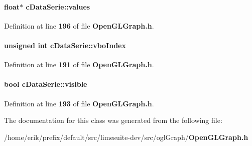 \paragraph[{values}]{\setlength{\rightskip}{0pt plus 5cm}float$\ast$ c\+Data\+Serie\+::values}\label{classcDataSerie_ac5a3ab7bf7737b1c0b9de669a98eeee3}


Definition at line {\bf 196} of file {\bf Open\+G\+L\+Graph.\+h}.

\paragraph[{vbo\+Index}]{\setlength{\rightskip}{0pt plus 5cm}unsigned {\bf int} c\+Data\+Serie\+::vbo\+Index}\label{classcDataSerie_aed65cceb54652b428820fe90b2843d95}


Definition at line {\bf 191} of file {\bf Open\+G\+L\+Graph.\+h}.

\paragraph[{visible}]{\setlength{\rightskip}{0pt plus 5cm}bool c\+Data\+Serie\+::visible}\label{classcDataSerie_a4b0ca62a320b263fb925d27dc40e55e8}


Definition at line {\bf 193} of file {\bf Open\+G\+L\+Graph.\+h}.



The documentation for this class was generated from the following file\+:\begin{DoxyCompactItemize}
\item 
/home/erik/prefix/default/src/limesuite-\/dev/src/ogl\+Graph/{\bf Open\+G\+L\+Graph.\+h}\end{DoxyCompactItemize}
